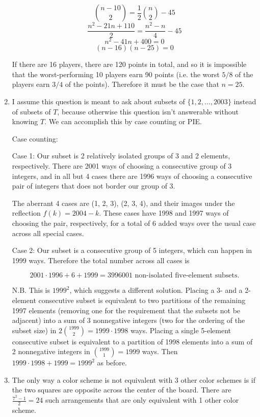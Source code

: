 \documentclass{book}
\numberwithin{equation}{section}
\begin{document}
\begin{enumerate}[label={9.\arabic*}]
$${n-10 \choose 2} = \frac{1}{2}{n \choose 2} - 45$$
$$\frac{n^2 - 21n + 110}{2} = \frac{n^2 - n}{4} - 45$$
$$n^2 - 41n + 400 = 0$$
$$(n-16)(n-25) = 0$$

If there are 16 players, there are 120 points in total, and so it is impossible that the worst-performing 10 players earn
90 points (i.e. the worst $5/8$ of the players earn $3/4$ of the points). Therefore it must be the case that $n = 25$.

\item
I assume this question is meant to ask about subsets of $\{1, 2, \ldots, 2003\}$ instead of subsets of $T$, because
otherwise this question isn't answerable without knowing $T$. We can accomplish this by case counting or PIE.

Case counting:

Case 1: Our subset is 2 relatively isolated groups of 3 and 2 elements, respectively. There are 2001 ways of choosing
a consecutive group of 3 integers, and in all but 4 cases there are 1996 ways of choosing a consecutive pair of integers
that does not border our group of 3.

The aberrant 4 cases are (1, 2, 3), (2, 3, 4), and their images under the reflection $f(k) = 2004 - k$. These
cases have 1998 and 1997 ways of choosing the pair, respectively, for a total of 6 added ways over the usual case across
all special cases.

Case 2: Our subset is a consecutive group of 5 integers, which can happen in 1999 ways. Therefore the total number across
all cases is

$$2001\cdot1996 + 6 + 1999 = 3996001 \text{ non-isolated five-element subsets.}$$

N.B. This is $1999^2$, which suggests a different solution. Placing a 3- and a 2-element consecutive subset is equivalent
to two partitions of the remaining 1997 elements (removing one for the requirement that the subsets not be adjacent)
into a sum of 3 nonnegative integers (two for the ordering of the subset
size) in $2{1999 \choose 2} = 1999\cdot1998$ ways. Placing a single 5-element consecutive subset is equivalent to a partition of
1998 elements into a sum of 2 nonnegative integers in ${1999 \choose 1} = 1999$ ways. Then
$1999\cdot1998 + 1999 = 1999^2$ as before.

\item
The only way a color scheme is not equivalent with 3 other color schemes is if the two squares are opposite across the
center of the board. There are $\frac{7^2 - 1}{2} = 24$ such arrangements that are only equivalent with 1 other color scheme.


\end{enumerate}
\end{document}
